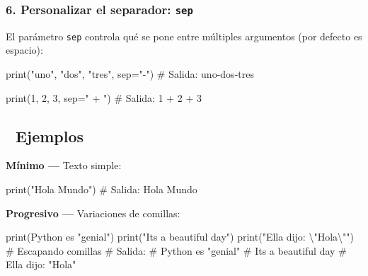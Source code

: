 \documentclass[
  doc,
  floatsintext,
  longtable,
  a4paper,
  nolmodern,
  notxfonts,
  notimes,
  12pt,
  colorlinks=true,linkcolor=blue,citecolor=blue,urlcolor=blue]{apa7}
\newenvironment{Shaded}{\begin{snugshade}}{\end{snugshade}}
\newcommand{\BuiltInTok}[1]{\textcolor[rgb]{0.00,0.23,0.31}{#1}}
\newcommand{\CharTok}[1]{\textcolor[rgb]{0.13,0.47,0.30}{#1}}
\newcommand{\CommentTok}[1]{\textcolor[rgb]{0.37,0.37,0.37}{#1}}
\newcommand{\DecValTok}[1]{\textcolor[rgb]{0.68,0.00,0.00}{#1}}
\newcommand{\NormalTok}[1]{\textcolor[rgb]{0.00,0.23,0.31}{#1}}
\newcommand{\OperatorTok}[1]{\textcolor[rgb]{0.37,0.37,0.37}{#1}}
\newcommand{\StringTok}[1]{\textcolor[rgb]{0.13,0.47,0.30}{#1}}
\begin{document}
\subsubsection{\texorpdfstring{6. Personalizar el separador:
\texttt{sep}}{6. Personalizar el separador: sep}}\label{personalizar-el-separador-sep}

El parámetro \texttt{sep} controla qué se pone entre múltiples
argumentos (por defecto es espacio):

\begin{Shaded}
\begin{Highlighting}[]
\BuiltInTok{print}\NormalTok{(}\StringTok{"uno"}\NormalTok{, }\StringTok{"dos"}\NormalTok{, }\StringTok{"tres"}\NormalTok{, sep}\OperatorTok{=}\StringTok{"{-}"}\NormalTok{)}
\CommentTok{\# Salida: uno{-}dos{-}tres}

\BuiltInTok{print}\NormalTok{(}\DecValTok{1}\NormalTok{, }\DecValTok{2}\NormalTok{, }\DecValTok{3}\NormalTok{, sep}\OperatorTok{=}\StringTok{" + "}\NormalTok{)}
\CommentTok{\# Salida: 1 + 2 + 3}
\end{Highlighting}
\end{Shaded}

\subsection{🔬 Ejemplos}\label{ejemplos}

\textbf{Mínimo ---} Texto simple:

\begin{Shaded}
\begin{Highlighting}[]
\BuiltInTok{print}\NormalTok{(}\StringTok{"Hola Mundo"}\NormalTok{)}
\CommentTok{\# Salida: Hola Mundo}
\end{Highlighting}
\end{Shaded}

\textbf{Progresivo ---} Variaciones de comillas:

\begin{Shaded}
\begin{Highlighting}[]
\BuiltInTok{print}\NormalTok{(}\StringTok{\textquotesingle{}Python es "genial"\textquotesingle{}}\NormalTok{)}
\BuiltInTok{print}\NormalTok{(}\StringTok{"It\textquotesingle{}s a beautiful day"}\NormalTok{)}
\BuiltInTok{print}\NormalTok{(}\StringTok{"Ella dijo: }\CharTok{\textbackslash{}"}\StringTok{Hola}\CharTok{\textbackslash{}"}\StringTok{"}\NormalTok{)  }\CommentTok{\# Escapando comillas}
\CommentTok{\# Salida:}
\CommentTok{\# Python es "genial"}
\CommentTok{\# It\textquotesingle{}s a beautiful day}
\CommentTok{\# Ella dijo: "Hola"}
\end{Highlighting}
\end{Shaded}
\end{document}
